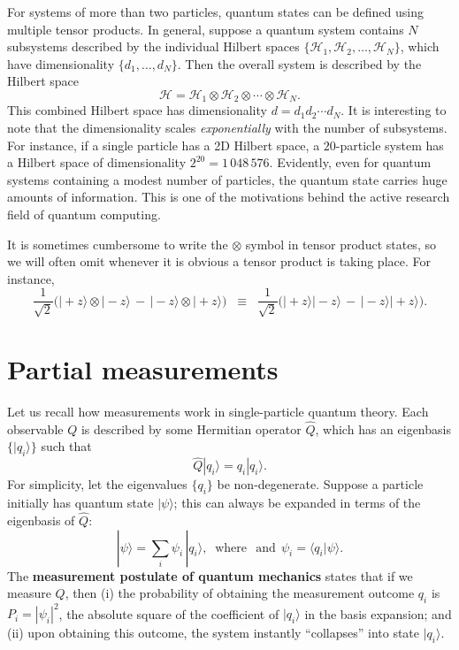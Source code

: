 \documentclass[pra,12pt]{revtex4}
\begin{document}
For systems of more than two particles, quantum states can be defined
using multiple tensor products.  In general, suppose a quantum system
contains $N$ subsystems described by the individual Hilbert spaces
$\{\mathscr{H}_1, \mathscr{H}_2, \dots, \mathscr{H}_N\}$, which have
dimensionality $\{d_1, \dots, d_N\}$.  Then the overall system is
described by the Hilbert space
$$\mathscr{H} = \mathscr{H}_1 \otimes \mathscr{H}_2 \otimes \cdots
\otimes \mathscr{H}_N.$$
This combined Hilbert space has dimensionality $d = d_1 d_2\cdots
d_N$.  It is interesting to note that the dimensionality scales
\textit{exponentially} with the number of subsystems.  For instance,
if a single particle has a 2D Hilbert space, a $20$-particle system
has a Hilbert space of dimensionality $2^{20} =1\,048\,576$.
Evidently, even for quantum systems containing a modest number of
particles, the quantum state carries huge amounts of information.
This is one of the motivations behind the active research field of
quantum computing.

It is sometimes cumbersome to write the $\otimes$ symbol in tensor
product states, so we will often omit whenever it is obvious a tensor
product is taking place.  For instance,
$$\frac{1}{\sqrt{2}} \Big(|\!+\!z\rangle\otimes|\!-\!z\rangle \,-\, |\!-\!z\rangle\otimes|\!+\!z\rangle\Big) \;\;\equiv \;\; \frac{1}{\sqrt{2}} \Big(|\!+\!z\rangle|\!-\!z\rangle \,-\, |\!-\!z\rangle|\!+\!z\rangle\Big).$$


\section{Partial measurements}
\label{sec:partialmeasurements}

Let us recall how measurements work in single-particle quantum theory.
Each observable $Q$ is described by some Hermitian operator $\hat{Q}$,
which has an eigenbasis $\{|q_i\rangle\}$ such that
$$\hat{Q}|q_i\rangle = q_i |q_i\rangle.$$
For simplicity, let the eigenvalues $\{q_i\}$ be non-degenerate.
Suppose a particle initially has quantum state $|\psi\rangle$; this
can always be expanded in terms of the eigenbasis of $\hat{Q}$:
$$|\psi\rangle = \sum_i \psi_i\, |q_i\rangle, \;\;\mathrm{where}\;\;\,\textrm{and}\;\, \psi_i = \langle q_i|\psi\rangle.$$
The \textbf{measurement postulate of quantum mechanics} states that if
we measure $Q$, then (i) the probability of obtaining the measurement
outcome $q_i$ is $P_i = |\psi_i|^2$, the absolute square of the
coefficient of $|q_i\rangle$ in the basis expansion; and (ii) upon
obtaining this outcome, the system instantly ``collapses'' into state
$|q_i\rangle$.
\end{document}
